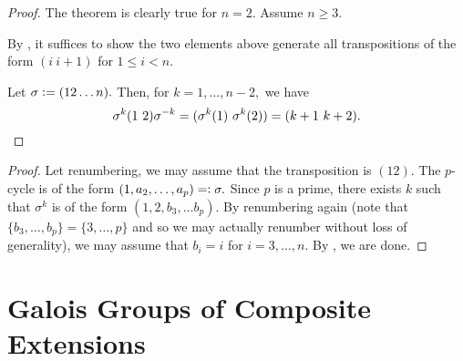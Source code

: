 \gentransposecycle*\label{thm:gentransposecycle2}
\begin{flushright}\hyperref[thm:gentransposecycle]{\upsym}\end{flushright}
\begin{proof}
    The theorem is clearly true for $n = 2.$ Assume $n \ge 3.$

    By , it suffices to show the two elements above generate all transpositions of the form $(i \ i + 1)$ for $1 \le i < n.$ 

    Let $\sigma \vcentcolon= (12 \ldots n).$ Then, for $k = 1, \ldots, n - 2,$ we have
    \begin{equation*} 
        \sigma^k(1 \ 2)\sigma^{-k} = (\sigma^k(1) \ \sigma^k(2)) = (k + 1 \ k + 2). \qedhere
    \end{equation*}
\end{proof}

\genprimetranscycle*\label{cor:genprimetranscycle2}
\begin{flushright}\hyperref[cor:genprimetranscycle]{\upsym}\end{flushright}
\begin{proof}
    Let renumbering, we may assume that the transposition is $(12).$ The $p$-cycle is of the form $(1, a_2, \ldots, a_{p}) =\vcentcolon \sigma.$ Since $p$ is a prime, there exists $k$ such that $\sigma^k$ is of the form $(1, 2, b_3, \ldots b_{p}).$ By renumbering again (note that $\{b_3, \ldots, b_p\} = \{3, \ldots, p\}$ and so we may actually renumber without loss of generality), we may assume that $b_i = i$ for $i = 3, \ldots, n.$ By , we are done.
\end{proof}

\section{Galois Groups of Composite Extensions}

